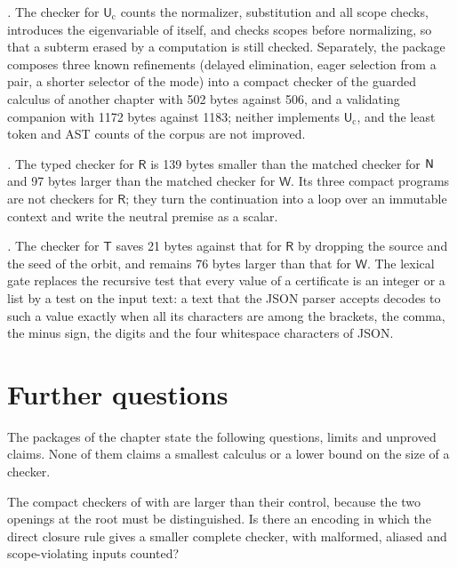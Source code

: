 \emph{.}  The checker for
$\mathsf{U}_{\mathrm{c}}$ counts the normalizer, substitution and all scope
checks, introduces the eigenvariable of  itself, and checks
scopes before normalizing, so that a subterm erased by a computation is
still checked.  Separately, the package composes three known refinements
(delayed elimination, eager selection from a pair, a shorter selector of
the mode) into a compact checker of the guarded calculus of another chapter
with 502 bytes against 506, and a validating companion with 1172 bytes
against 1183; neither implements $\mathsf{U}_{\mathrm{c}}$, and the least
token and AST counts of the corpus are not improved.

\emph{.}  The typed checker for $\mathsf{R}$ is 139
bytes smaller than the matched checker for $\mathsf{N}$ and 97 bytes larger than
the matched checker for $\mathsf{W}$.  Its three compact programs are not
checkers for $\mathsf{R}$; they turn the continuation into a loop over an
immutable context and write the neutral premise as a scalar.

\emph{.}  The checker for $\mathsf{T}$ saves 21 bytes
against that for $\mathsf{R}$ by dropping the source and the seed of the
orbit, and remains 76 bytes larger than that for $\mathsf{W}$.  The lexical
gate replaces the recursive test that every value of a certificate is an
integer or a list by a test on the input text: a text that the JSON parser
accepts decodes to such a value exactly when all its characters are among
the brackets, the comma, the minus sign, the digits and the four whitespace
characters of JSON.

\section{Further questions}
\label{kern:sec:questions}

The packages of the chapter state the following questions, limits and
unproved claims.  None of them claims a smallest calculus or a lower bound
on the size of a checker.

\begin{question}
\label{kern:q:directsize}
The compact checkers of  with 
are larger than their control, because the two openings at the root must be
distinguished.  Is there an encoding in which the direct closure rule gives
a smaller complete checker, with malformed, aliased and scope-violating
inputs counted?
\end{question}

